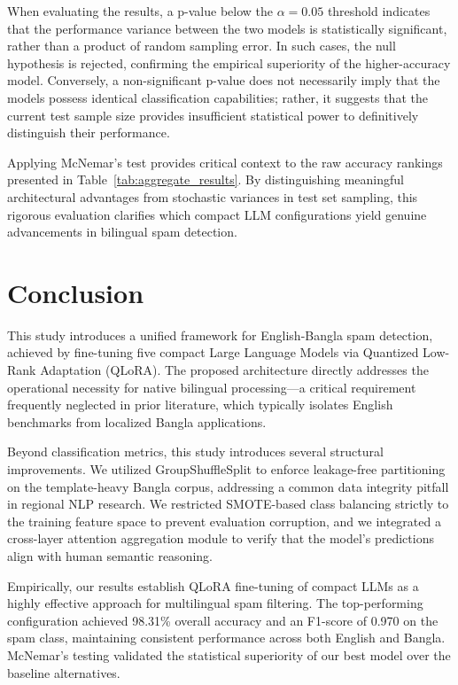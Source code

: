 \documentclass[journal]{IEEEtran}
\begin{document}
When evaluating the results, a p-value below the $\alpha = 0.05$ threshold indicates that the performance variance between the two models is statistically significant, rather than a product of random sampling error. In such cases, the null hypothesis is rejected, confirming the empirical superiority of the higher-accuracy model. Conversely, a non-significant p-value does not necessarily imply that the models possess identical classification capabilities; rather, it suggests that the current test sample size provides insufficient statistical power to definitively distinguish their performance.

Applying McNemar's test provides critical context to the raw accuracy rankings presented in Table~\ref{tab:aggregate_results}. By distinguishing meaningful architectural advantages from stochastic variances in test set sampling, this rigorous evaluation clarifies which compact LLM configurations yield genuine advancements in bilingual spam detection.

\balance
\section{Conclusion}

This study introduces a unified framework for English-Bangla spam detection, achieved by fine-tuning five compact Large Language Models via Quantized Low-Rank Adaptation (QLoRA). The proposed architecture directly addresses the operational necessity for native bilingual processing---a critical requirement frequently neglected in prior literature, which typically isolates English benchmarks from localized Bangla applications.

Beyond classification metrics, this study introduces several structural improvements. We utilized GroupShuffleSplit to enforce leakage-free partitioning on the template-heavy Bangla corpus, addressing a common data integrity pitfall in regional NLP research. We restricted SMOTE-based class balancing strictly to the training feature space to prevent evaluation corruption, and we integrated a cross-layer attention aggregation module to verify that the model's predictions align with human semantic reasoning.

Empirically, our results establish QLoRA fine-tuning of compact LLMs as a highly effective approach for multilingual spam filtering. The top-performing configuration achieved 98.31\% overall accuracy and an F1-score of 0.970 on the spam class, maintaining consistent performance across both English and Bangla. McNemar's testing validated the statistical superiority of our best model over the baseline alternatives.
\end{document}
